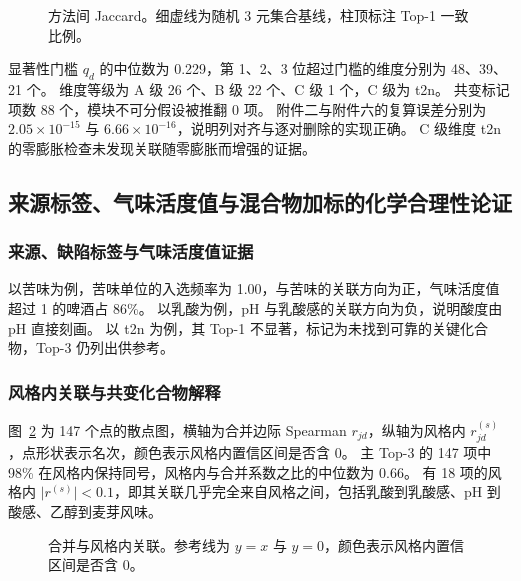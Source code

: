 \begin{figure}[htbp]\centering
{}
\caption{方法间 Jaccard。细虚线为随机 3 元集合基线，柱顶标注 Top-1 一致比例。}
\label{fig:q2-jaccard}
\end{figure}

显著性门槛 $q_d$ 的中位数为 0.229，第 1、2、3 位超过门槛的维度分别为 48、39、21 个。
维度等级为 A 级 26 个、B 级 22 个、C 级 1 个，C 级为 t2n。
共变标记项数 88 个，模块不可分假设被推翻 0 项。
附件二与附件六的复算误差分别为 $2.05\times10^{-15}$ 与 $6.66\times10^{-16}$，说明列对齐与逐对删除的实现正确。
C 级维度 t2n 的零膨胀检查未发现关联随零膨胀而增强的证据。

\subsection{来源标签、气味活度值与混合物加标的化学合理性论证}

\subsubsection{来源、缺陷标签与气味活度值证据}

以苦味为例，苦味单位的入选频率为 1.00，与苦味的关联方向为正，气味活度值超过 1 的啤酒占 86\%。
以乳酸为例，pH 与乳酸感的关联方向为负，说明酸度由 pH 直接刻画。
以 t2n 为例，其 Top-1 不显著，标记为未找到可靠的关键化合物，Top-3 仍列出供参考。

\subsubsection{风格内关联与共变化合物解释}

图~\ref{fig:q2-scatter} 为 147 个点的散点图，横轴为合并边际 Spearman $r_{jd}$，纵轴为风格内 $r^{(s)}_{jd}$，点形状表示名次，颜色表示风格内置信区间是否含 0。
主 Top-3 的 147 项中 98\% 在风格内保持同号，风格内与合并系数之比的中位数为 0.66。
有 18 项的风格内 $\lvert r^{(s)}\rvert<0.1$，即其关联几乎完全来自风格之间，包括乳酸到乳酸感、pH 到酸感、乙醇到麦芽风味。

\begin{figure}[htbp]\centering
{}
\caption{合并与风格内关联。参考线为 $y=x$ 与 $y=0$，颜色表示风格内置信区间是否含 0。}
\label{fig:q2-scatter}
\end{figure}

